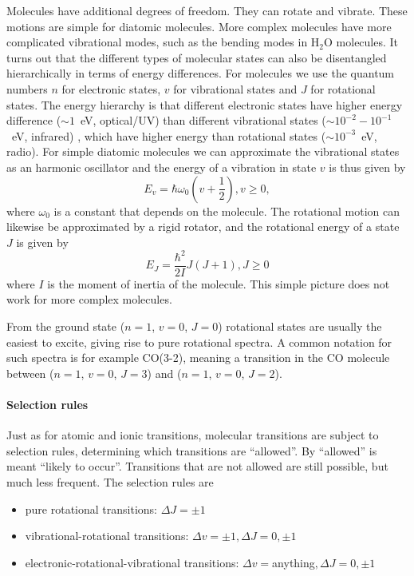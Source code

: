 \documentclass[12pt]{article}
\numberwithin{equation}{section}
\newcommand{\be}{\begin{equation}}
\newcommand{\ee}{\end{equation}}
\begin{document}
Molecules have additional degrees of freedom. They can rotate and vibrate. These motions are simple for diatomic molecules. More complex molecules have more complicated vibrational modes, such as the bending modes in H$_2$O molecules. It turns out that the different types of molecular states can also be disentangled hierarchically in terms of energy differences. For molecules we use the quantum numbers $n$ for electronic states, $v$ for vibrational states and $J$ for rotational states. The energy hierarchy is that different electronic states have higher energy difference ($\sim 1$~eV, optical/UV) than different vibrational states ($\sim 10^{-2}-10^{-1}$~eV, infrared) , which have higher energy than rotational states ($\sim 10^{-3}$~eV, radio). For simple diatomic molecules we can approximate the vibrational states as an harmonic oscillator and the energy of a vibration in state $v$ is thus given by 
\be
E_v = \hbar \omega_0 (v+\frac{1}{2}), v\ge0,
\ee
where $\omega_0$ is a constant that depends on the molecule. The rotational motion can likewise be approximated by a rigid rotator, and the rotational energy of a state $J$ is given by
\be
E_J = \frac{\hbar^2}{2I} J(J+1), J\ge0
\ee 
where $I$ is the moment of inertia of the molecule. This simple picture does not work for more complex molecules.

From the ground state ($n=1$, $v=0$, $J=0$) rotational states are usually the easiest to excite, giving rise to pure rotational spectra. A common notation for such spectra is for example CO(3-2), meaning a transition in the CO molecule between  ($n=1$, $v=0$, $J=3$) and  ($n=1$, $v=0$, $J=2$).

\paragraph{Selection rules}
Just as for atomic and ionic transitions, molecular transitions are subject to selection rules, determining which transitions are ``allowed''. By ``allowed'' is meant ``likely to occur''. Transitions that are not allowed are still possible, but much less frequent. The selection rules are
\begin{itemize}
\item pure rotational transitions: $\Delta J = \pm 1$
\item vibrational-rotational transitions:  $\Delta v =\pm 1, \Delta J = 0, \pm 1$
\item electronic-rotational-vibrational transitions: $\Delta v =$anything$, \Delta J = 0, \pm 1$
\end{itemize}
\end{document}
